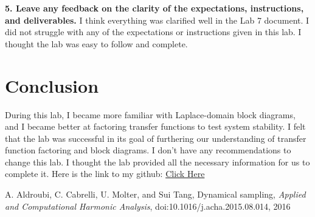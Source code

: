 \documentclass[12pt]{report}
\begin{document}
\textbf{5. Leave any feedback on the clarity of the expectations, instructions, and deliverables.}
{I think everything was clarified well in the Lab 7 document. I did not struggle with any of the expectations or instructions given in this lab. I thought the lab was easy to follow and complete.}



\section{Conclusion}

During this lab, I became more familiar with Laplace-domain block diagrams, and I became better at factoring transfer functions to test system stability. I felt that the lab was successful in its goal of furthering our understanding of transfer function factoring and block diagrams. I don't have any recommendations to change this lab. I thought the lab provided all the necessary information for us to complete it. Here is the link to my github: \href{https://github.com/JMac1999}{Click Here}

\newpage


\begin{thebibliography}{111}

A. Aldroubi, C. Cabrelli, U. Molter, and Sui Tang,
Dynamical sampling, 
{\it  Applied and Computational Harmonic Analysis}, doi:10.1016/j.acha.2015.08.014, 2016


\end{thebibliography}
\end{document}
